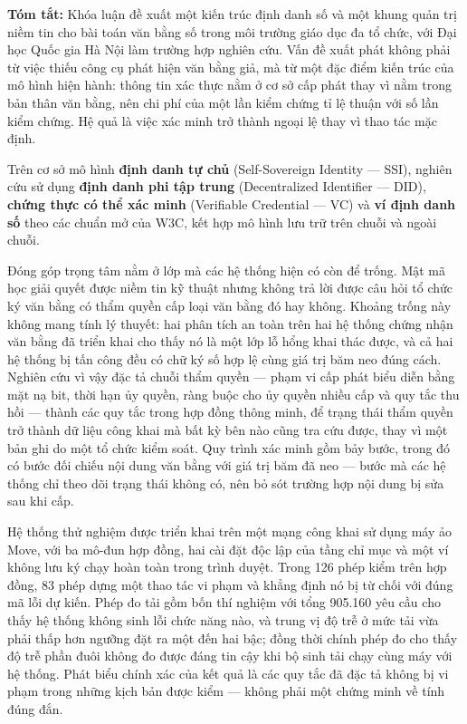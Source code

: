 
{\fsize{12pt}
\textbf{Tóm tắt:} Khóa luận đề xuất một kiến trúc định danh số và một khung quản trị niềm tin cho bài toán văn bằng số trong môi trường giáo dục đa tổ chức, với Đại học Quốc gia Hà Nội làm trường hợp nghiên cứu. Vấn đề xuất phát không phải từ việc thiếu công cụ phát hiện văn bằng giả, mà từ một đặc điểm kiến trúc của mô hình hiện hành: thông tin xác thực nằm ở cơ sở cấp phát thay vì nằm trong bản thân văn bằng, nên chi phí của một lần kiểm chứng tỉ lệ thuận với số lần kiểm chứng. Hệ quả là việc xác minh trở thành ngoại lệ thay vì thao tác mặc định.

Trên cơ sở mô hình \textbf{định danh tự chủ} (Self-Sovereign Identity --- SSI), nghiên cứu sử dụng \textbf{định danh phi tập trung} (Decentralized Identifier --- DID), \textbf{chứng thực có thể xác minh} (Verifiable Credential --- VC) và \textbf{ví định danh số} theo các chuẩn mở của W3C, kết hợp mô hình lưu trữ trên chuỗi và ngoài chuỗi.

Đóng góp trọng tâm nằm ở lớp mà các hệ thống hiện có còn để trống. Mật mã học giải quyết được niềm tin kỹ thuật nhưng không trả lời được câu hỏi tổ chức ký văn bằng có thẩm quyền cấp loại văn bằng đó hay không. Khoảng trống này không mang tính lý thuyết: hai phân tích an toàn trên hai hệ thống chứng nhận văn bằng đã triển khai cho thấy nó là một lớp lỗ hổng khai thác được, và cả hai hệ thống bị tấn công đều có chữ ký số hợp lệ cùng giá trị băm neo đúng cách. Nghiên cứu vì vậy đặc tả chuỗi thẩm quyền --- phạm vi cấp phát biểu diễn bằng mặt nạ bit, thời hạn ủy quyền, ràng buộc cho ủy quyền nhiều cấp và quy tắc thu hồi --- thành các quy tắc trong hợp đồng thông minh, để trạng thái thẩm quyền trở thành dữ liệu công khai mà bất kỳ bên nào cũng tra cứu được, thay vì một bản ghi do một tổ chức kiểm soát. Quy trình xác minh gồm bảy bước, trong đó có bước đối chiếu nội dung văn bằng với giá trị băm đã neo --- bước mà các hệ thống chỉ theo dõi trạng thái không có, nên bỏ sót trường hợp nội dung bị sửa sau khi cấp.

Hệ thống thử nghiệm được triển khai trên một mạng công khai sử dụng máy ảo Move, với ba mô-đun hợp đồng, hai cài đặt độc lập của tầng chỉ mục và một ví không lưu ký chạy hoàn toàn trong trình duyệt. Trong 126 phép kiểm trên hợp đồng, 83 phép dựng một thao tác vi phạm và khẳng định nó bị từ chối với đúng mã lỗi dự kiến. Phép đo tải gồm bốn thí nghiệm với tổng 905.160 yêu cầu cho thấy hệ thống không sinh lỗi chức năng nào, và trung vị độ trễ ở mức tải vừa phải thấp hơn ngưỡng đặt ra một đến hai bậc; đồng thời chính phép đo cho thấy độ trễ phần đuôi không đo được đáng tin cậy khi bộ sinh tải chạy cùng máy với hệ thống. Phát biểu chính xác của kết quả là các quy tắc đã đặc tả không bị vi phạm trong những kịch bản được kiểm --- không phải một chứng minh về tính đúng đắn.

}
